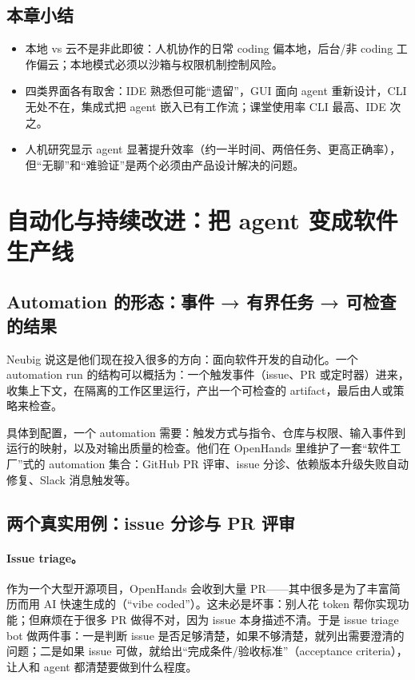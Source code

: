 \documentclass[a4paper]{article}
\begin{document}
\subsection{本章小结}

\begin{itemize}
\item 本地 vs 云不是非此即彼：人机协作的日常 coding 偏本地，后台/非 coding 工作偏云；本地模式必须以沙箱与权限机制控制风险。
\item 四类界面各有取舍：IDE 熟悉但可能“遗留”，GUI 面向 agent 重新设计，CLI 无处不在，集成式把 agent 嵌入已有工作流；课堂使用率 CLI 最高、IDE 次之。
\item 人机研究显示 agent 显著提升效率（约一半时间、两倍任务、更高正确率），但“无聊”和“难验证”是两个必须由产品设计解决的问题。
\end{itemize}

\section{自动化与持续改进：把 agent 变成软件生产线}

\subsection{Automation 的形态：事件 → 有界任务 → 可检查的结果}

Neubig 说这是他们现在投入很多的方向：面向软件开发的自动化。一个 automation run 的结构可以概括为：一个触发事件（issue、PR 或定时器）进来，收集上下文，在隔离的工作区里运行，产出一个可检查的 artifact，最后由人或策略来检查。

具体到配置，一个 automation 需要：触发方式与指令、仓库与权限、输入事件到运行的映射，以及对输出质量的检查。他们在 OpenHands 里维护了一套“软件工厂”式的 automation 集合：GitHub PR 评审、issue 分诊、依赖版本升级失败自动修复、Slack 消息触发等。

\subsection{两个真实用例：issue 分诊与 PR 评审}

\paragraph{Issue triage。}作为一个大型开源项目，OpenHands 会收到大量 PR——其中很多是为了丰富简历而用 AI 快速生成的（“vibe coded”）。这未必是坏事：别人花 token 帮你实现功能；但麻烦在于很多 PR 做得不对，因为 issue 本身描述不清。于是 issue triage bot 做两件事：一是判断 issue 是否足够清楚，如果不够清楚，就列出需要澄清的问题；二是如果 issue 可做，就给出“完成条件/验收标准”（acceptance criteria），让人和 agent 都清楚要做到什么程度。
\end{document}
